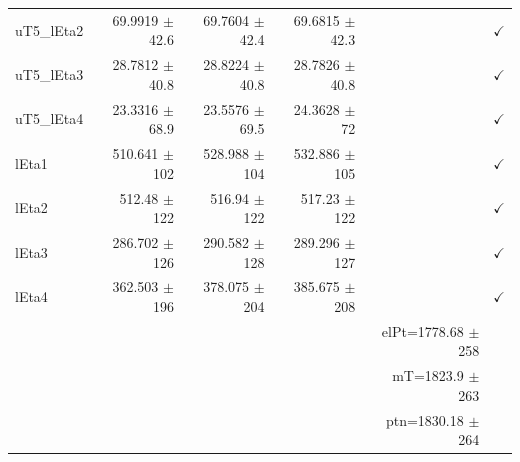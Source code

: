 \begin{table}[htbp]
\begin{tabular}{lrrrrr}
uT5\_lEta2 & 69.9919 $\pm$ 42.6 & 69.7604 $\pm$ 42.4 & 69.6815 $\pm$ 42.3 &  & $\checkmark$ \\
uT5\_lEta3 & 28.7812 $\pm$ 40.8 & 28.8224 $\pm$ 40.8 & 28.7826 $\pm$ 40.8 &  & $\checkmark$ \\
uT5\_lEta4 & 23.3316 $\pm$ 68.9 & 23.5576 $\pm$ 69.5 & 24.3628 $\pm$ 72 &  & $\checkmark$ \\
\hline
lEta1 & 510.641 $\pm$ 102 & 528.988 $\pm$ 104 & 532.886 $\pm$ 105 &  & $\checkmark$ \\
lEta2 & 512.48 $\pm$ 122 & 516.94 $\pm$ 122 & 517.23 $\pm$ 122 &  & $\checkmark$ \\
lEta3 & 286.702 $\pm$ 126 & 290.582 $\pm$ 128 & 289.296 $\pm$ 127 &  & $\checkmark$ \\
lEta4 & 362.503 $\pm$ 196 & 378.075 $\pm$ 204 & 385.675 $\pm$ 208 &  & $\checkmark$ \\
\hline
 &  &  &  & elPt=1778.68 $\pm$ 258 &  \\
 &  &  &  & mT=1823.9 $\pm$ 263 &  \\
 &  &  &  & ptn=1830.18 $\pm$ 264 &  \\
\hline
\end{tabular}
\end{table}